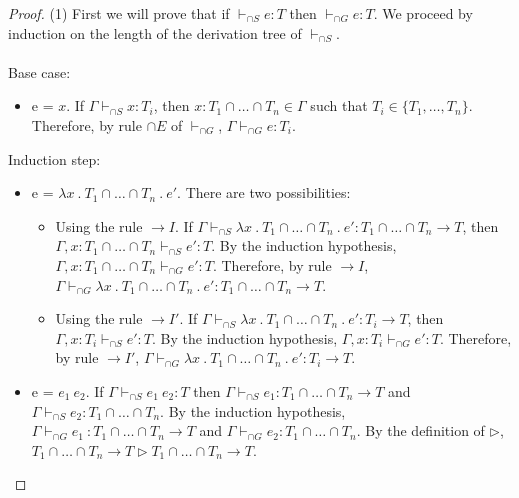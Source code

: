 \documentclass[a4paper]{article}
\begin{document}
\begin{proof}
(1) First we will prove that if $\vdash_{\cap S} e : T$ then $\vdash_{\cap G} e : T$.
We proceed by induction on the length of the derivation tree of $\vdash_{\cap S}$.\\\\
Base case:
\begin{itemize}
    \item e = $x$.
    If $\Gamma \vdash_{\cap S} x : T_i$, then $x : T_1 \cap \ldots \cap T_n \in \Gamma$ such that $T_i \in \{T_1, \ldots, T_n\}$.
    Therefore, by rule $\cap E$ of $\vdash_{\cap G}$, $\Gamma \vdash_{\cap G} e : T_i$.\\
\end{itemize}
Induction step:
\begin{itemize}
    \item e = $\lambda x\ .\ T_1 \cap \ldots \cap T_n\ .\ e'$.
    There are two possibilities:
    \begin{itemize}
        \item Using the rule ${\rightarrow} I$.
        If $\Gamma \vdash_{\cap S} \lambda x\ .\ T_1 \cap \ldots \cap T_n\ .\ e' : T_1 \cap \ldots \cap T_n \rightarrow T$, then $\Gamma, x : T_1 \cap \ldots \cap T_n \vdash_{\cap S} e' : T$.
        By the induction hypothesis, $\Gamma, x : T_1 \cap \ldots \cap T_n \vdash_{\cap G} e' : T$.
        Therefore, by rule ${\rightarrow} I$, $\Gamma \vdash_{\cap G} \lambda x\ .\ T_1 \cap \ldots \cap T_n\ .\ e' : T_1 \cap \ldots \cap T_n \rightarrow T$.
        \item Using the rule ${\rightarrow} I'$.
        If $\Gamma \vdash_{\cap S} \lambda x\ .\ T_1 \cap \ldots \cap T_n\ .\ e' : T_i \rightarrow T$, then $\Gamma, x : T_i \vdash_{\cap S} e' : T$.
        By the induction hypothesis, $\Gamma, x : T_i \vdash_{\cap G} e' : T$.
        Therefore, by rule ${\rightarrow} I'$, $\Gamma \vdash_{\cap G} \lambda x\ .\ T_1 \cap \ldots \cap T_n\ .\ e' : T_i \rightarrow T$.
    \end{itemize}
    \item e = $e_1\ e_2$.
    If $\Gamma \vdash_{\cap S} e_1\ e_2 : T$ then $\Gamma \vdash_{\cap S} e_1 : T_1 \cap \ldots \cap T_n \rightarrow T$ and $\Gamma \vdash_{\cap S} e_2 : T_1 \cap \ldots \cap T_n$.
    By the induction hypothesis, $\Gamma \vdash_{\cap G} e_1\ : T_1 \cap \ldots \cap T_n \rightarrow T$ and $\Gamma \vdash_{\cap G} e_2 : T_1 \cap \ldots \cap T_n$.
    By the definition of $\rhd$, $T_1 \cap \ldots \cap T_n \rightarrow T \rhd T_1 \cap \ldots \cap T_n \rightarrow T$.

\end{itemize}
\end{proof}
\end{document}

